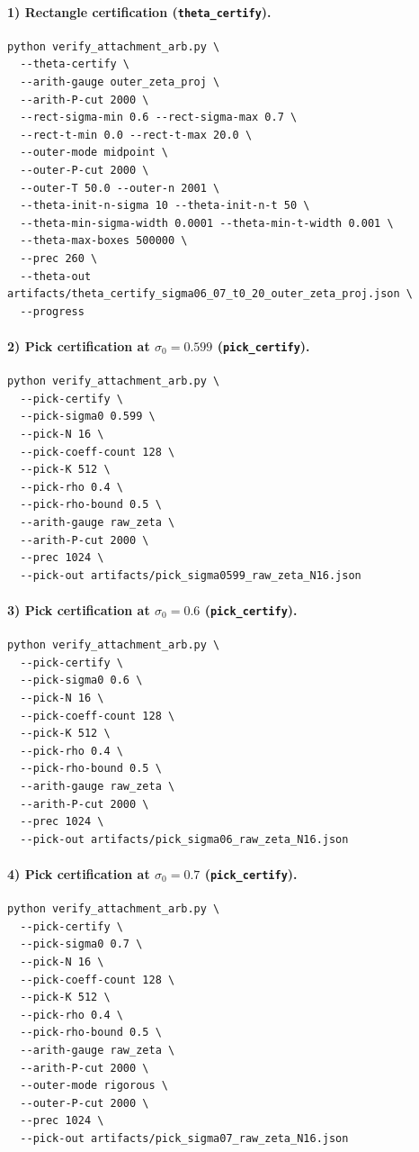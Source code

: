 \documentclass[11pt]{amsart}
\theoremstyle{definition}
\theoremstyle{remark}
\begin{document}
\paragraph{1) Rectangle certification (\texttt{theta\_certify}).}
\begin{verbatim}
python verify_attachment_arb.py \
  --theta-certify \
  --arith-gauge outer_zeta_proj \
  --arith-P-cut 2000 \
  --rect-sigma-min 0.6 --rect-sigma-max 0.7 \
  --rect-t-min 0.0 --rect-t-max 20.0 \
  --outer-mode midpoint \
  --outer-P-cut 2000 \
  --outer-T 50.0 --outer-n 2001 \
  --theta-init-n-sigma 10 --theta-init-n-t 50 \
  --theta-min-sigma-width 0.0001 --theta-min-t-width 0.001 \
  --theta-max-boxes 500000 \
  --prec 260 \
  --theta-out artifacts/theta_certify_sigma06_07_t0_20_outer_zeta_proj.json \
  --progress
\end{verbatim}

\paragraph{2) Pick certification at $\sigma_0=0.599$ (\texttt{pick\_certify}).}
\begin{verbatim}
python verify_attachment_arb.py \
  --pick-certify \
  --pick-sigma0 0.599 \
  --pick-N 16 \
  --pick-coeff-count 128 \
  --pick-K 512 \
  --pick-rho 0.4 \
  --pick-rho-bound 0.5 \
  --arith-gauge raw_zeta \
  --arith-P-cut 2000 \
  --prec 1024 \
  --pick-out artifacts/pick_sigma0599_raw_zeta_N16.json
\end{verbatim}

\paragraph{3) Pick certification at $\sigma_0=0.6$ (\texttt{pick\_certify}).}
\begin{verbatim}
python verify_attachment_arb.py \
  --pick-certify \
  --pick-sigma0 0.6 \
  --pick-N 16 \
  --pick-coeff-count 128 \
  --pick-K 512 \
  --pick-rho 0.4 \
  --pick-rho-bound 0.5 \
  --arith-gauge raw_zeta \
  --arith-P-cut 2000 \
  --prec 1024 \
  --pick-out artifacts/pick_sigma06_raw_zeta_N16.json
\end{verbatim}

\paragraph{4) Pick certification at $\sigma_0=0.7$ (\texttt{pick\_certify}).}
\begin{verbatim}
python verify_attachment_arb.py \
  --pick-certify \
  --pick-sigma0 0.7 \
  --pick-N 16 \
  --pick-coeff-count 128 \
  --pick-K 512 \
  --pick-rho 0.4 \
  --pick-rho-bound 0.5 \
  --arith-gauge raw_zeta \
  --arith-P-cut 2000 \
  --outer-mode rigorous \
  --outer-P-cut 2000 \
  --prec 1024 \
  --pick-out artifacts/pick_sigma07_raw_zeta_N16.json
\end{verbatim}
\end{document}
